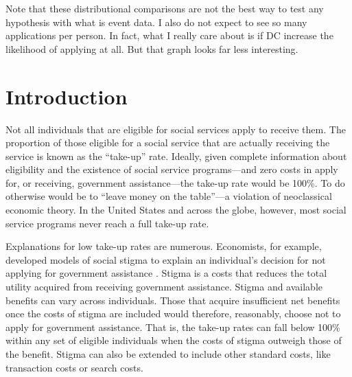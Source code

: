 \documentclass[12pt,letterpaperpaper,]{book}
\begin{document}
Note that these distributional comparisons are not the best way to test
any hypothesis with what is event data. I also do not expect to see so
many applications per person. In fact, what I really care about is if DC
increase the likelihood of applying at all. But that graph looks far
less interesting.

\section*{Introduction}\label{intro-2}

Not all individuals that are eligible for social services apply to
receive them. The proportion of those eligible for a social service that
are actually receiving the service is known as the ``take-up'' rate.
Ideally, given complete information about eligibility and the existence
of social service programs---and zero costs in apply for, or receiving,
government assistance---the take-up rate would be 100\%. To do otherwise
would be to ``leave money on the table''---a violation of neoclassical
economic theory. In the United States and across the globe, however,
most social service programs never reach a full take-up rate.

Explanations for low take-up rates are numerous. Economists, for
example, developed models of social stigma to explain an individual's
decision for not applying for government assistance
\citep{moffitt_economic_1983}. Stigma is a costs that reduces the total
utility acquired from receiving government assistance. Stigma and
available benefits can vary across individuals. Those that acquire
insufficient net benefits once the costs of stigma are included would
therefore, reasonably, choose not to apply for government assistance.
That is, the take-up rates can fall below 100\% within any set of
eligible individuals when the costs of stigma outweigh those of the
benefit. Stigma can also be extended to include other standard costs,
like transaction costs or search costs.
\end{document}
